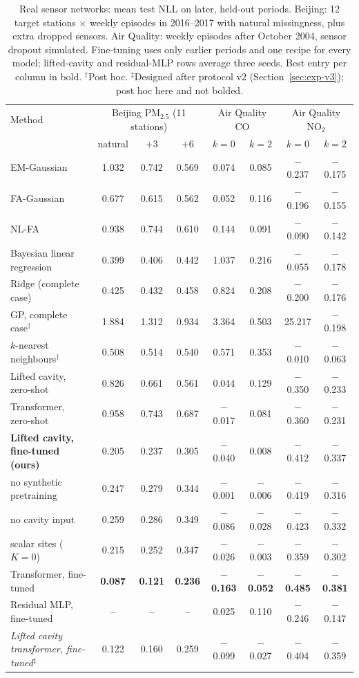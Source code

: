 \begin{table}[t]
\centering\scriptsize
\setlength{\tabcolsep}{2.5pt}
\caption{\label{tab:real}Real sensor networks: mean test NLL on later, held-out periods. Beijing: 12 target stations $\times$ weekly episodes in 2016--2017 with natural missingness, plus extra dropped sensors. Air Quality: weekly episodes after October 2004, sensor dropout simulated. Fine-tuning uses only earlier periods and one recipe for every model; lifted-cavity and residual-MLP rows average three seeds. Best entry per column in bold. $^\dagger$Post hoc. $^\ddagger$Designed after protocol v2 (Section~\ref{sec:exp-v3}); post hoc here and not bolded.}
\begin{tabular}{lccccccc}
\toprule
Method & \multicolumn{3}{c}{Beijing PM$_{2.5}$ (11 stations)} & \multicolumn{2}{c}{Air Quality CO} & \multicolumn{2}{c}{Air Quality NO$_2$}\\
 & natural & $+3$ & $+6$ & $k{=}0$ & $k{=}2$ & $k{=}0$ & $k{=}2$\\
\midrule
EM-Gaussian & 1.032 & 0.742 & 0.569 & 0.074 & 0.085 & $-$0.237 & $-$0.175\\
FA-Gaussian & 0.677 & 0.615 & 0.562 & 0.052 & 0.116 & $-$0.196 & $-$0.155\\
NL-FA & 0.938 & 0.744 & 0.610 & 0.144 & 0.091 & $-$0.090 & $-$0.142\\
Bayesian linear regression & 0.399 & 0.406 & 0.442 & 1.037 & 0.216 & $-$0.055 & $-$0.178\\
Ridge (complete case) & 0.425 & 0.432 & 0.458 & 0.824 & 0.208 & $-$0.200 & $-$0.176\\
GP, complete case$^\dagger$ & 1.884 & 1.312 & 0.934 & 3.364 & 0.503 & 25.217 & $-$0.198\\
$k$-nearest neighbours$^\dagger$ & 0.508 & 0.514 & 0.540 & 0.571 & 0.353 & $-$0.010 & $-$0.063\\
\midrule
Lifted cavity, zero-shot & 0.826 & 0.661 & 0.561 & 0.044 & 0.129 & $-$0.350 & $-$0.233\\
Transformer, zero-shot & 0.958 & 0.743 & 0.687 & $-$0.017 & 0.081 & $-$0.360 & $-$0.231\\
\midrule
\textbf{Lifted cavity, fine-tuned (ours)} & 0.205 & 0.237 & 0.305 & $-$0.040 & 0.008 & $-$0.412 & $-$0.337\\
\quad no synthetic pretraining & 0.247 & 0.279 & 0.344 & $-$0.001 & $-$0.006 & $-$0.419 & $-$0.316\\
\quad no cavity input & 0.259 & 0.286 & 0.349 & $-$0.086 & $-$0.028 & $-$0.423 & $-$0.332\\
\quad scalar sites ($K=0$) & 0.215 & 0.252 & 0.347 & $-$0.026 & $-$0.003 & $-$0.359 & $-$0.302\\
Transformer, fine-tuned & \textbf{0.087} & \textbf{0.121} & \textbf{0.236} & \textbf{$-$0.163} & \textbf{$-$0.052} & \textbf{$-$0.485} & \textbf{$-$0.381}\\
Residual MLP, fine-tuned & -- & -- & -- & 0.025 & 0.110 & $-$0.246 & $-$0.147\\
\emph{Lifted cavity transformer, fine-tuned}$^\ddagger$ & 0.122 & 0.160 & 0.259 & $-$0.099 & $-$0.027 & $-$0.404 & $-$0.359\\
\bottomrule
\end{tabular}
\end{table}
